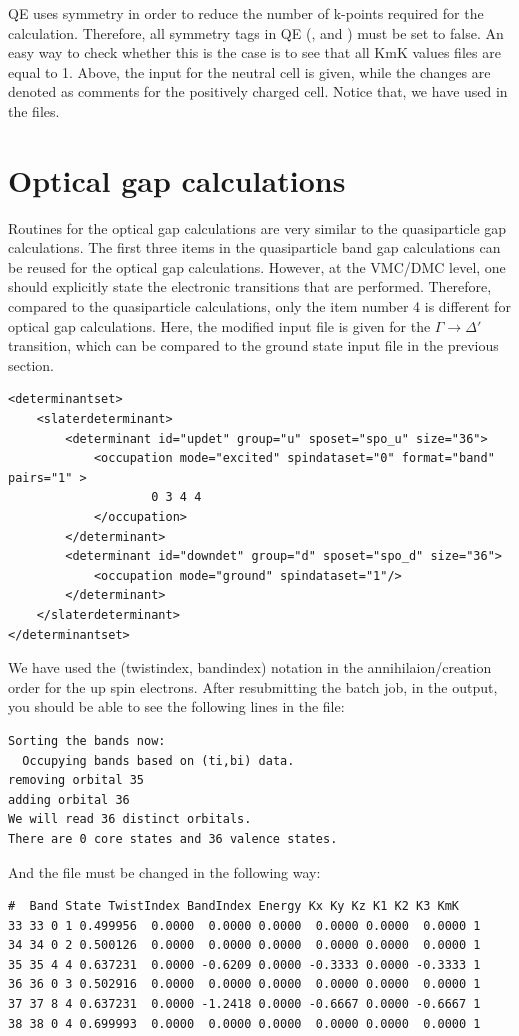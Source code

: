 QE uses symmetry in order to reduce the number of k-points required for the calculation. 
Therefore, all symmetry tags in QE (,  and ) must be set to false. 
An easy way to check whether this is the case is to see that all KmK values  files are equal to 1. 
Above, the input for the neutral cell is given, while the changes are denoted as comments for the positively charged cell. 
Notice that, we have used  in the  files.
\section{Optical gap calculations}
Routines for the optical gap calculations are very similar to the quasiparticle gap calculations. 
The first three items in the quasiparticle band gap calculations can be reused for the optical gap calculations. 
However, at the VMC/DMC level, one should explicitly state the electronic transitions that are performed. 
Therefore, compared to the quasiparticle calculations, only the item number 4 is different for optical gap calculations. 
Here, the modified input file is given for the $\Gamma\rightarrow\Delta'$ transition, which can be compared to the ground state input file in the previous section. 
\begin{lstlisting}[style=QMCPXML]
<determinantset>
	<slaterdeterminant>
		<determinant id="updet" group="u" sposet="spo_u" size="36">
		    <occupation mode="excited" spindataset="0" format="band" pairs="1" >
					0 3 4 4
		    </occupation>
		</determinant>
		<determinant id="downdet" group="d" sposet="spo_d" size="36">
		    <occupation mode="ground" spindataset="1"/>	
		</determinant>
	</slaterdeterminant>
</determinantset>
\end{lstlisting}
We have used the (twistindex, bandindex) notation in the annihilaion/creation order for the up spin electrons.
After resubmitting the batch job, in the output, you should be able to see the following lines in the  file:
\begin{lstlisting}[style=SHELL]
Sorting the bands now:
  Occupying bands based on (ti,bi) data.
removing orbital 35
adding orbital 36
We will read 36 distinct orbitals.
There are 0 core states and 36 valence states.
\end{lstlisting}
And the  file must be changed in the following way: 
\begin{lstlisting}[style=SHELL]
#  Band State TwistIndex BandIndex Energy Kx Ky Kz K1 K2 K3 KmK
33 33 0	1 0.499956	0.0000  0.0000 0.0000  0.0000 0.0000  0.0000 1
34 34 0	2 0.500126	0.0000  0.0000 0.0000  0.0000 0.0000  0.0000 1
35 35 4	4 0.637231	0.0000 -0.6209 0.0000 -0.3333 0.0000 -0.3333 1
36 36 0	3 0.502916	0.0000  0.0000 0.0000  0.0000 0.0000  0.0000 1
37 37 8	4 0.637231	0.0000 -1.2418 0.0000 -0.6667 0.0000 -0.6667 1
38 38 0	4 0.699993	0.0000  0.0000 0.0000  0.0000 0.0000  0.0000 1
\end{lstlisting}

